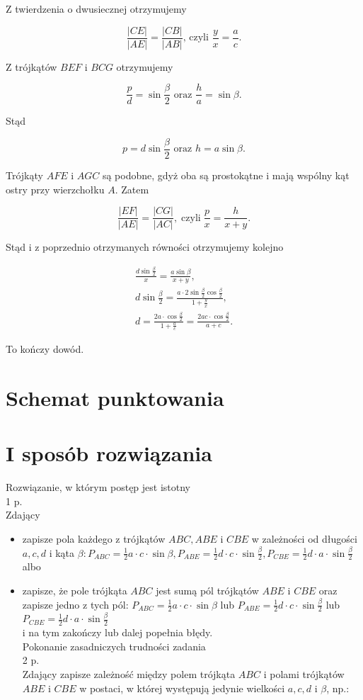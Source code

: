 \documentclass[10pt]{article}
\begin{document}
Z twierdzenia o dwusiecznej otrzymujemy

$$
\frac{|C E|}{|A E|}=\frac{|C B|}{|A B|} \text {, czyli } \frac{y}{x}=\frac{a}{c} .
$$

Z trójkątów $B E F$ i $B C G$ otrzymujemy

$$
\frac{p}{d}=\sin \frac{\beta}{2} \text { oraz } \frac{h}{a}=\sin \beta .
$$

Stąd

$$
p=d \sin \frac{\beta}{2} \text { oraz } h=a \sin \beta .
$$

Trójkąty $A F E$ i $A G C$ są podobne, gdyż oba są prostokątne i mają wspólny kąt ostry przy wierzchołku $A$. Zatem

$$
\frac{|E F|}{|A E|}=\frac{|C G|}{|A C|}, \operatorname{czyli} \frac{p}{x}=\frac{h}{x+y} .
$$

Stąd i z poprzednio otrzymanych równości otrzymujemy kolejno

$$
\begin{gathered}
\frac{d \sin \frac{\beta}{2}}{x}=\frac{a \sin \beta}{x+y}, \\
d \sin \frac{\beta}{2}=\frac{a \cdot 2 \sin \frac{\beta}{2} \cos \frac{\beta}{2}}{1+\frac{y}{x}}, \\
d=\frac{2 a \cdot \cos \frac{\beta}{2}}{1+\frac{a}{c}}=\frac{2 a c \cdot \cos \frac{\beta}{2}}{a+c} .
\end{gathered}
$$

To kończy dowód.

\section*{Schemat punktowania}
\section*{I sposób rozwiązania}
Rozwiązanie, w którym postęp jest istotny\\
1 p.\\
Zdający

\begin{itemize}
  \item zapisze pola każdego z trójkątów $A B C, A B E$ i $C B E$ w zależności od długości $a, c, d$ i kąta $\beta: P_{A B C}=\frac{1}{2} a \cdot c \cdot \sin \beta, P_{A B E}=\frac{1}{2} d \cdot c \cdot \sin \frac{\beta}{2}, P_{C B E}=\frac{1}{2} d \cdot a \cdot \sin \frac{\beta}{2}$\\
albo
  \item zapisze, że pole trójkąta $A B C$ jest sumą pól trójkątów $A B E$ i $C B E$ oraz zapisze jedno z tych pól: $P_{A B C}=\frac{1}{2} a \cdot c \cdot \sin \beta$ lub $P_{A B E}=\frac{1}{2} d \cdot c \cdot \sin \frac{\beta}{2}$ lub $P_{C B E}=\frac{1}{2} d \cdot a \cdot \sin \frac{\beta}{2}$\\
i na tym zakończy lub dalej popełnia błędy.\\
Pokonanie zasadniczych trudności zadania\\
2 p.\\
Zdający zapisze zależność między polem trójkąta $A B C$ i polami trójkątów $A B E$ i $C B E$ w postaci, w której występują jedynie wielkości $a, c, d$ i $\beta$, np.:
\end{itemize}
\end{document}
